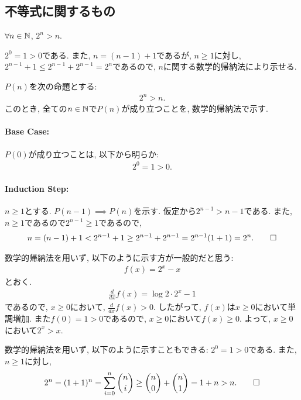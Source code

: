 \subsection{不等式に関するもの}
\begin{prop}
  \label{p:20230808}
  $\forall n\in\mathbb{N}$, $2^n> n$.
\end{prop}
\begin{proof**}
  $2^0=1> 0$である.
  また,
  $n=(n-1)+1$であるが,
  $n\geq 1$に対し,
  $2^{n-1}+1\leq  2^{n-1}+2^{n-1}=2^n$であるので,
  $n$に関する数学的帰納法により示せる.
\end{proof**}
\begin{proof*}
  $P(n)$を次の命題とする:
  \begin{align*}
    2^n>n
    .
  \end{align*}
  このとき,
  全ての$n\in\mathbb{N}$で$P(n)$が成り立つことを,
  数学的帰納法で示す.

  \paragraph{Base Case:}
  $P(0)$が成り立つことは, 以下から明らか:
  \begin{align*}
    2^0=1> 0.
  \end{align*}
  \paragraph{Induction Step:}
  $n\geq 1$とする.
  $P(n-1)\implies P(n)$を示す.
  仮定から$2^{n-1}>n-1$である.
  また, $n\geq 1$であるので$2^{n-1}\geq 1$であるので,
  \begin{align*}
    n=(n-1)+1<2^{n-1}+1\geq 2^{n-1}+2^{n-1}=2^{n-1}(1+1)=2^n
    .\qedhere
  \end{align*}
\end{proof*}

\begin{rem}
  数学的帰納法を用いず, 以下のように示す方が一般的だと思う:
  \begin{align*}
    f(x)=2^x-x
  \end{align*}
  とおく.
  \begin{align*}
    \frac{d}{dx}f(x)=\log 2 \cdot 2^x-1
  \end{align*}
  であるので, $x\geq 0$において, $\frac{d}{dx}f(x)> 0$.
  したがって, $f(x)$は$x\geq 0$において単調増加.
  また$f(0)=1>0$であるので,
  $x\geq 0$において$f(x)\geq 0$.
  よって, $x\geq 0$において$2^x>x$.
\end{rem}

\begin{rem}
  数学的帰納法を用いず, 以下のように示すこともできる:
  $2^0=1>0$である.
  また, $n\geq 1$に対し,
  \begin{align*}
    2^n=(1+1)^n=\sum_{i=0}^n \binom{n}{i}\geq \binom{n}{0}+\binom{n}{1}=1+n>n
    .\qedhere
  \end{align*}
\end{rem}

